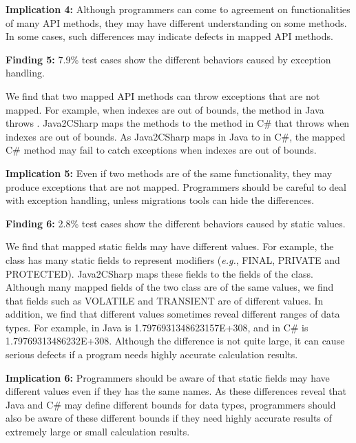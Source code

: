 \textbf{Implication 4:} Although programmers can come to agreement on functionalities of many API methods, they may have different understanding on some methods. In some cases, such differences may indicate defects in mapped API methods.


\textbf{Finding 5:} 7.9\% test cases show the different behaviors caused by exception handling.

We find that two mapped API methods can throw exceptions that are not mapped. For example, when indexes are out of bounds, the  method in Java throws . Java2CSharp maps the methods to the  method in C\# that throws  when indexes are out of bounds. As Java2CSharp maps  in Java to  in C\#, the mapped C\# method may fail to catch exceptions when indexes are out of bounds.

\textbf{Implication 5:} Even if two methods are of the same functionality, they may produce exceptions that are not mapped. Programmers should be careful to deal with exception handling, unless migrations tools can hide the differences.



\textbf{Finding 6:} 2.8\% test cases show the different behaviors caused by static values.

We find that mapped static fields may have different values. For example, the  class has many static fields to represent modifiers (\emph{e.g.}, FINAL, PRIVATE and PROTECTED). Java2CSharp maps these fields to the fields of the  class. Although many mapped fields of the two class are of the same values, we find that fields such as VOLATILE and TRANSIENT are of different values. In addition, we find that different values sometimes reveal different ranges of data types. For example,  in Java is 1.7976931348623157E+308, and  in C\# is 1.79769313486232E+308. Although the difference is not quite large, it can cause serious defects if a program needs highly accurate calculation results.

\textbf{Implication 6:} Programmers should be aware of that static fields may have different values even if they has the same names. As these differences reveal that Java and C\# may define different bounds for data types, programmers should also be aware of these different bounds if they need highly accurate results of extremely large or small calculation results.

